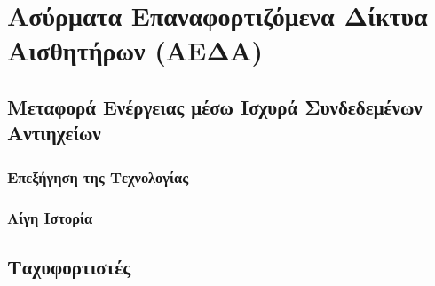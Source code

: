 

\chapter{Ασύρματα Επαναφορτιζόμενα Δίκτυα Αισθητήρων (ΑΕΔΑ)}
\section{Μεταφορά Ενέργειας μέσω Ισχυρά Συνδεδεμένων Αντιηχείων}
\subsection{Επεξήγηση της Τεχνολογίας}
\subsection{Λίγη Ιστορία}
\section{Ταχυφορτιστές}
\label{ch:wrsns}